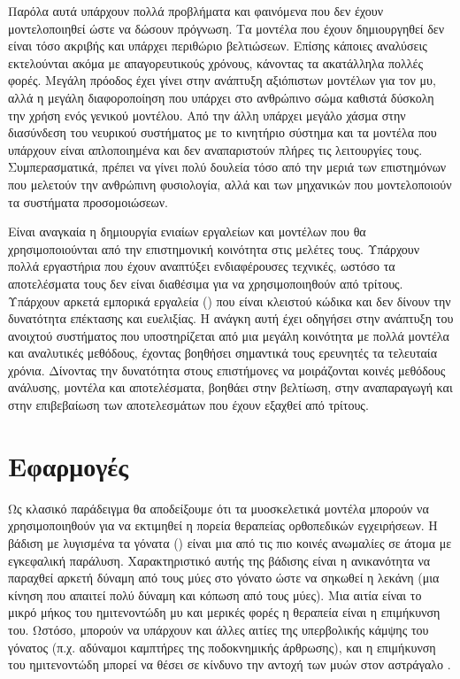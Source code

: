 Παρόλα αυτά υπάρχουν πολλά προβλήματα και φαινόμενα που δεν έχουν μοντελοποιηθεί ώστε να δώσουν πρόγνωση. Τα μοντέλα που έχουν δημιουργηθεί δεν είναι τόσο ακριβής και υπάρχει περιθώριο βελτιώσεων. Επίσης κάποιες αναλύσεις εκτελούνται ακόμα με απαγορευτικούς χρόνους, κάνοντας τα ακατάλληλα πολλές φορές. Μεγάλη πρόοδος έχει γίνει στην ανάπτυξη αξιόπιστων μοντέλων για τον μυ, αλλά η μεγάλη διαφοροποίηση που υπάρχει στο ανθρώπινο σώμα καθιστά δύσκολη την χρήση ενός γενικού μοντέλου. Από την άλλη υπάρχει μεγάλο χάσμα στην διασύνδεση του νευρικού συστήματος με το κινητήριο σύστημα και τα μοντέλα που υπάρχουν είναι απλοποιημένα και δεν αναπαριστούν πλήρες τις λειτουργίες τους. Συμπερασματικά, πρέπει να γίνει πολύ δουλεία τόσο από την μεριά των επιστημόνων που μελετούν την ανθρώπινη φυσιολογία, αλλά και των μηχανικών που μοντελοποιούν τα συστήματα προσομοιώσεων.

Είναι αναγκαία η δημιουργία ενιαίων εργαλείων και μοντέλων που θα χρησιμοποιούνται από την επιστημονική κοινότητα στις μελέτες τους. Υπάρχουν πολλά εργαστήρια που έχουν αναπτύξει ενδιαφέρουσες τεχνικές, ωστόσο τα αποτελέσματα τους δεν είναι διαθέσιμα για να χρησιμοποιηθούν από τρίτους. Υπάρχουν αρκετά εμπορικά εργαλεία () που είναι κλειστού κώδικα και δεν δίνουν την δυνατότητα επέκτασης και ευελιξίας. Η ανάγκη αυτή έχει οδηγήσει στην ανάπτυξη του ανοιχτού συστήματος  που υποστηρίζεται από μια μεγάλη κοινότητα με πολλά μοντέλα και αναλυτικές μεθόδους, έχοντας βοηθήσει σημαντικά τους ερευνητές τα τελευταία χρόνια. Δίνοντας την δυνατότητα στους επιστήμονες να μοιράζονται κοινές μεθόδους ανάλυσης, μοντέλα και αποτελέσματα, βοηθάει στην βελτίωση, στην αναπαραγωγή και στην επιβεβαίωση των αποτελεσμάτων που έχουν εξαχθεί από τρίτους.

\section{Εφαρμογές}

Ως κλασικό παράδειγμα θα αποδείξουμε ότι τα μυοσκελετικά μοντέλα μπορούν να χρησιμοποιηθούν για να εκτιμηθεί η πορεία θεραπείας ορθοπεδικών εγχειρήσεων. Η βάδιση με λυγισμένα τα γόνατα () είναι μια από τις πιο κοινές ανωμαλίες σε άτομα με εγκεφαλική παράλυση. Χαρακτηριστικό αυτής της βάδισης είναι η ανικανότητα να παραχθεί αρκετή δύναμη από τους μύες στο γόνατο ώστε να σηκωθεί η λεκάνη (μια κίνηση που απαιτεί πολύ δύναμη και κόπωση από τους μύες).  Μια αιτία είναι το μικρό μήκος του ημιτενοντώδη μυ και μερικές φορές η θεραπεία είναι η επιμήκυνση του. Ωστόσο, μπορούν να υπάρχουν και άλλες αιτίες της υπερβολικής κάμψης του γόνατος (π.χ. αδύναμοι καμπτήρες της ποδοκνημικής άρθρωσης), και η επιμήκυνση του ημιτενοντώδη μπορεί να θέσει σε κίνδυνο την αντοχή των μυών στον αστράγαλο \cite{arnolda06}.

